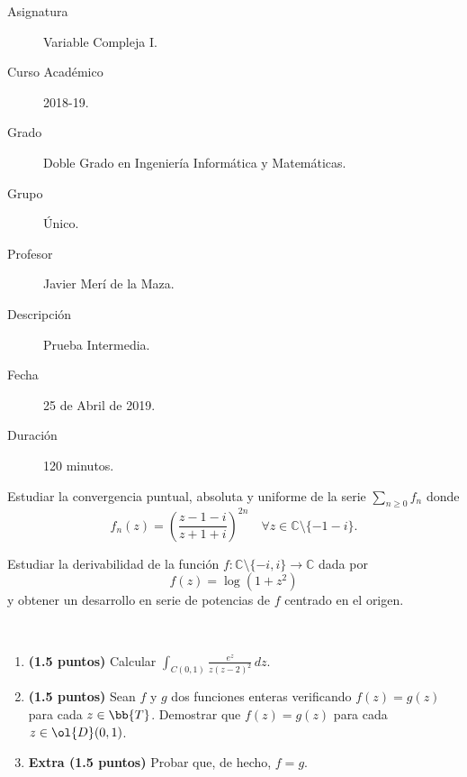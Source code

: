 \documentclass[12pt]{article}
\begin{document}

    
    

    \begin{description}
        \item[Asignatura] Variable Compleja I.
        \item[Curso Académico] 2018-19.
        \item[Grado] Doble Grado en Ingeniería Informática y Matemáticas.
        \item[Grupo] Único.
        \item[Profesor] Javier Merí de la Maza.
        \item[Descripción] Prueba Intermedia.
        \item[Fecha] 25 de Abril de 2019.
        \item[Duración] 120 minutos.
    \end{description}
    \newpage

    \begin{ejercicio}[3.5 puntos]
        Estudiar la convergencia puntual, absoluta y uniforme de la serie $\sum\limits_{n \geq 0} f_n$ donde
        \[
            f_n(z) = \left( \frac{z - 1 - i}{z + 1 + i} \right)^{2n} \quad \forall z \in \mathbb{C} \setminus \{-1 - i\}.
        \]
    \end{ejercicio}

    \begin{ejercicio}[3.5 puntos]
        Estudiar la derivabilidad de la función $f : \mathbb{C} \setminus \{-i, i\} \to \mathbb{C}$ dada por
        \[
            f(z) = \log(1 + z^2)
        \]
        y obtener un desarrollo en serie de potencias de $f$ centrado en el origen.
    \end{ejercicio}

    \begin{ejercicio}~
        \begin{enumerate}
            \item \textbf{(1.5 puntos)} Calcular $\displaystyle \int_{C(0,1)} \frac{e^z}{z(z - 2)^2} \, dz$.
            \item \textbf{(1.5 puntos)} Sean $f$ y $g$ dos funciones enteras verificando $f(z) = g(z)$ para cada $z \in \bb{T}$. Demostrar que $f(z) = g(z)$ para cada $z \in \ol{D}(0, 1)$.
            \item \textbf{Extra (1.5 puntos)} Probar que, de hecho, $f = g$.
        \end{enumerate}        
    \end{ejercicio}
\end{document}
